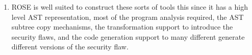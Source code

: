 \begin{enumerate}
   \item ROSE is well suited to construct these sorts of tools this since it has a high
         level AST representation, most of the program analysis required, the AST subtree
         copy mechanisms, the transformation support to introduce the security flaws, and 
         the code generation support to many different generate different versions of
         the security flaw.

\end{enumerate}
